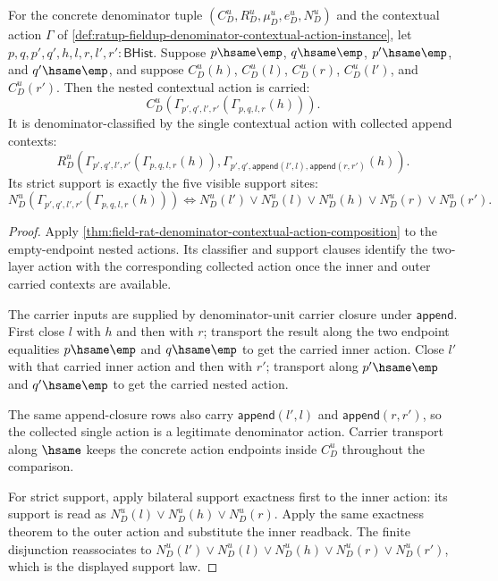 \begin{theorem}
\label{thm:field-rat-denominator-contextual-action-composition-support-laws}
For the concrete denominator tuple
$(C_D^u,R_D^u,\mu_D^u,e_D^u,N_D^u)$ and the contextual action $\Gamma$ of
\autoref{def:ratup-fieldup-denominator-contextual-action-instance}, let
$p,q,p',q',h,l,r,l',r':\mathsf{BHist}$. Suppose
$p\hsame\emp$, $q\hsame\emp$, $p'\hsame\emp$, and $q'\hsame\emp$, and suppose
$C_D^u(h)$, $C_D^u(l)$, $C_D^u(r)$, $C_D^u(l')$, and $C_D^u(r')$. Then the
nested contextual action is carried:
$$
C_D^u(\Gamma_{p',q',l',r'}(\Gamma_{p,q,l,r}(h))).
$$
It is denominator-classified by the single contextual action with collected
append contexts:
$$
R_D^u(\Gamma_{p',q',l',r'}(\Gamma_{p,q,l,r}(h)),
\Gamma_{p',q',\mathsf{append}(l',l),\mathsf{append}(r,r')}(h)).
$$
Its strict support is exactly the five visible support sites:
$$
N_D^u(\Gamma_{p',q',l',r'}(\Gamma_{p,q,l,r}(h)))
\Longleftrightarrow
N_D^u(l')\lor N_D^u(l)\lor N_D^u(h)\lor N_D^u(r)\lor N_D^u(r').
$$
\end{theorem}
\begin{proof}
Apply
\autoref{thm:field-rat-denominator-contextual-action-composition} to the
empty-endpoint nested actions. Its classifier and support clauses identify the
two-layer action with the corresponding collected action once the inner and
outer carried contexts are available.

The carrier inputs are supplied by denominator-unit carrier closure under
$\mathsf{append}$. First close $l$ with $h$ and then with $r$; transport the
result along the two endpoint equalities $p\hsame\emp$ and $q\hsame\emp$ to get
the carried inner action. Close $l'$ with that carried inner action and then
with $r'$; transport along $p'\hsame\emp$ and $q'\hsame\emp$ to get the carried
nested action.

The same append-closure rows also carry
$\mathsf{append}(l',l)$ and $\mathsf{append}(r,r')$, so the collected single
action is a legitimate denominator action. Carrier transport along $\hsame$
keeps the concrete action endpoints inside $C_D^u$ throughout the comparison.

For strict support, apply bilateral support exactness first to the inner action:
its support is read as $N_D^u(l)\lor N_D^u(h)\lor N_D^u(r)$. Apply the same
exactness theorem to the outer action and substitute the inner readback. The
finite disjunction reassociates to
$N_D^u(l')\lor N_D^u(l)\lor N_D^u(h)\lor N_D^u(r)\lor N_D^u(r')$, which is the
displayed support law.
\end{proof}

